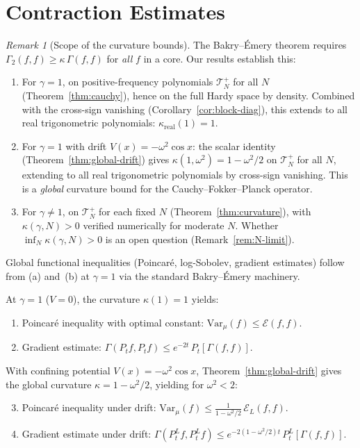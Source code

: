 \documentclass[11pt,a4paper]{article}
\theoremstyle{plain}
\theoremstyle{definition}
\theoremstyle{remark}
\newtheorem{remark}[theorem]{Remark}
\newcommand{\Var}{\mathrm{Var}}
\begin{document}
\section{Contraction Estimates}\label{sec:func-ineq}

\begin{remark}[Scope of the curvature bounds]
\label{rem:scope}
The Bakry--\'Emery theorem requires
$\Gamma_2(f,f) \geq \kappa\,\Gamma(f,f)$ for \emph{all}
$f$ in a core.  Our results establish this:
\begin{enumerate}[label=(\alph*)]
\item For $\gamma = 1$, on positive-frequency polynomials
  $\mathcal{T}_N^+$ for all $N$ (Theorem~\ref{thm:cauchy}),
  hence on the full Hardy space by density.
  Combined with the cross-sign vanishing
  (Corollary~\ref{cor:block-diag}), this extends to
  all real trigonometric polynomials:
  $\kappa_{\mathrm{real}}(1) = 1$.
\item For $\gamma = 1$ with drift $V(x) = -\omega^2\cos x$:
  the scalar identity (Theorem~\ref{thm:global-drift}) gives
  $\kappa(1,\omega^2) = 1 - \omega^2/2$ on $\mathcal{T}_N^+$
  for all $N$, extending to all real trigonometric polynomials
  by cross-sign vanishing.  This is a \emph{global} curvature
  bound for the Cauchy--Fokker--Planck operator.
\item For $\gamma \neq 1$, on $\mathcal{T}_N^+$ for
  each fixed $N$ (Theorem~\ref{thm:curvature}), with
  $\kappa(\gamma,N) > 0$ verified numerically for
  moderate $N$.  Whether $\inf_N \kappa(\gamma,N) > 0$
  is an open question (Remark~\ref{rem:N-limit}).
\end{enumerate}
Global functional inequalities (Poincar\'e, log-Sobolev,
gradient estimates) follow from (a) and~(b) at $\gamma = 1$
via the standard Bakry--\'Emery machinery.
\end{remark}

At $\gamma = 1$ ($V = 0$), the curvature $\kappa(1) = 1$
yields:
\begin{enumerate}[label=(\roman*)]
\item Poincar\'e inequality with optimal constant:
  $\Var_\mu(f) \leq \mathcal{E}(f,f)$.
\item Gradient estimate:
  $\Gamma(P_t f, P_t f) \leq e^{-2t}\,P_t[\Gamma(f,f)]$.
\end{enumerate}

With confining potential $V(x) = -\omega^2\cos x$,
Theorem~\ref{thm:global-drift} gives the global curvature
$\kappa = 1 - \omega^2/2$, yielding for $\omega^2 < 2$:
\begin{enumerate}[label=(\roman*)]
\setcounter{enumi}{2}
\item Poincar\'e inequality under drift:
  $\Var_\mu(f) \leq \frac{1}{1-\omega^2/2}\,\mathcal{E}_L(f,f)$.
\item Gradient estimate under drift:
  $\Gamma(P_t^L f, P_t^L f) \leq
  e^{-2(1-\omega^2/2)t}\,P_t^L[\Gamma(f,f)]$.
\end{enumerate}
\end{document}
